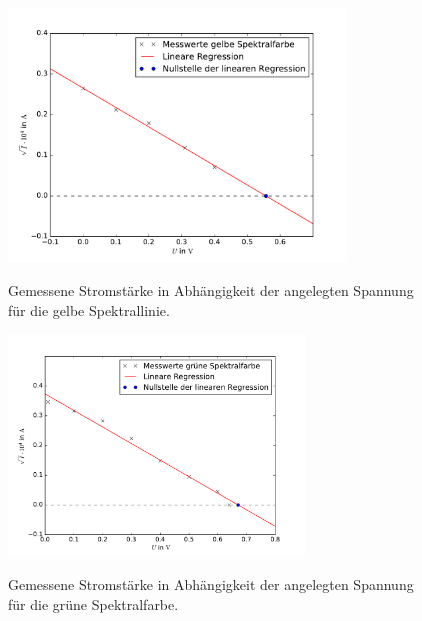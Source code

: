 \begin{figure}
  \centering
  \includegraphics[width = 0.8\textwidth]{Pics/gelbe_Spektrallinie.pdf} \\[0cm]
  \caption{Gemessene Stromstärke in Abhängigkeit der angelegten Spannung für die
           gelbe Spektrallinie.}
  \label{fig:Gelb}
\end{figure}

\newpage




\begin{figure}
  \centering
  \includegraphics[width = 0.7\textwidth]{Pics/gruene_Spektrallinie.pdf}\\[0cm]
  \caption{Gemessene Stromstärke in Abhängigkeit der angelegten Spannung für die
           grüne Spektralfarbe.}
  \label{fig:Gruen}
\end{figure}

\newpage



